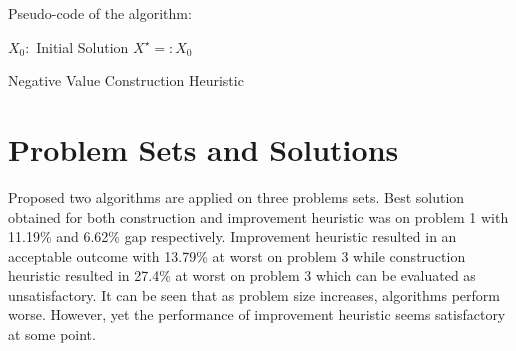 \documentclass[11pt]{article}
\begin{document}
Pseudo-code of the algorithm:


\begin{algorithm}[H]
\SetAlgoLined
 $X_0:$ Initial Solution\;
 $X^{\star} =: X_0$\;
 \caption{Negative Value Construction Heuristic}
\end{algorithm}


    \hypertarget{probsets}{%
\section{Problem Sets and Solutions}\label{probsets}}

Proposed two algorithms are applied on three problems sets. Best solution obtained for both construction and improvement heuristic was on problem 1 with 11.19\% and 6.62\% gap respectively. Improvement heuristic resulted in an acceptable outcome with 13.79\% at worst on problem 3 while construction heuristic resulted in 27.4\% at worst on problem 3 which can be evaluated as unsatisfactory. It can be seen that as problem size increases, algorithms perform worse. However, yet the performance of improvement heuristic seems satisfactory at some point. 

\pagebreak
\end{document}

